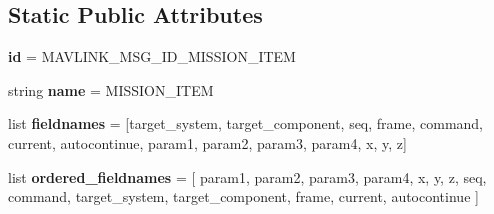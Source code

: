 \subsection*{Static Public Attributes}
\begin{DoxyCompactItemize}
\item 
\mbox{\label{classpymavlink_1_1dialects_1_1v10_1_1MAVLink__mission__item__message_a3e01ddc70c08e9a9d449eb4ff63e04b4}} 
{\bfseries id} = M\+A\+V\+L\+I\+N\+K\+\_\+\+M\+S\+G\+\_\+\+I\+D\+\_\+\+M\+I\+S\+S\+I\+O\+N\+\_\+\+I\+T\+EM
\item 
\mbox{\label{classpymavlink_1_1dialects_1_1v10_1_1MAVLink__mission__item__message_ad6799815e2d3f11f5ec5233a4d860f11}} 
string {\bfseries name} = \textquotesingle{}M\+I\+S\+S\+I\+O\+N\+\_\+\+I\+T\+EM\textquotesingle{}
\item 
\mbox{\label{classpymavlink_1_1dialects_1_1v10_1_1MAVLink__mission__item__message_aa86bc524d8ac43e290b9a252441b85ff}} 
list {\bfseries fieldnames} = \mbox{[}\textquotesingle{}target\+\_\+system\textquotesingle{}, \textquotesingle{}target\+\_\+component\textquotesingle{}, \textquotesingle{}seq\textquotesingle{}, \textquotesingle{}frame\textquotesingle{}, \textquotesingle{}command\textquotesingle{}, \textquotesingle{}current\textquotesingle{}, \textquotesingle{}autocontinue\textquotesingle{}, \textquotesingle{}param1\textquotesingle{}, \textquotesingle{}param2\textquotesingle{}, \textquotesingle{}param3\textquotesingle{}, \textquotesingle{}param4\textquotesingle{}, \textquotesingle{}x\textquotesingle{}, \textquotesingle{}y\textquotesingle{}, \textquotesingle{}z\textquotesingle{}\mbox{]}
\item 
\mbox{\label{classpymavlink_1_1dialects_1_1v10_1_1MAVLink__mission__item__message_a1857d6a9d507fc4cd091a971ce7dc8f3}} 
list {\bfseries ordered\+\_\+fieldnames} = \mbox{[} \textquotesingle{}param1\textquotesingle{}, \textquotesingle{}param2\textquotesingle{}, \textquotesingle{}param3\textquotesingle{}, \textquotesingle{}param4\textquotesingle{}, \textquotesingle{}x\textquotesingle{}, \textquotesingle{}y\textquotesingle{}, \textquotesingle{}z\textquotesingle{}, \textquotesingle{}seq\textquotesingle{}, \textquotesingle{}command\textquotesingle{}, \textquotesingle{}target\+\_\+system\textquotesingle{}, \textquotesingle{}target\+\_\+component\textquotesingle{}, \textquotesingle{}frame\textquotesingle{}, \textquotesingle{}current\textquotesingle{}, \textquotesingle{}autocontinue\textquotesingle{} \mbox{]}

\end{DoxyCompactItemize}
